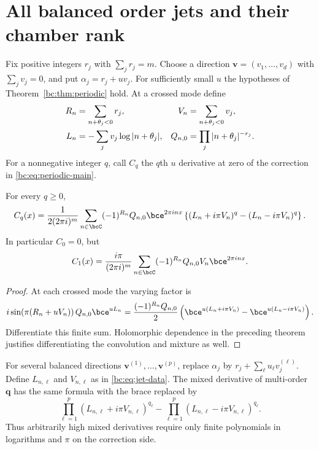 \section{All balanced order jets and their chamber rank}
\label{bc:sec:jets}

Fix positive integers $r_j$ with $\sum_jr_j=m$. Choose a direction
$\bm v=(v_1,\ldots,v_d)$ with $\sum_jv_j=0$, and put
$\alpha_j=r_j+uv_j$. For sufficiently small $u$ the hypotheses of
Theorem~\ref{bc:thm:periodic} hold. At a crossed mode define
\begin{align}
 R_n&=\sum_{n+\theta_j<0}r_j,&
 V_n&=\sum_{n+\theta_j<0}v_j,\notag\\
 L_n&=-\sum_jv_j\log|n+\theta_j|,&
 Q_{n,0}&=\prod_j|n+\theta_j|^{-r_j}.
 \label{bc:eq:jet-data}
\end{align}
For a nonnegative integer $q$, call $C_q$ the $q$th $u$ derivative at zero
of the correction in \eqref{bc:eq:periodic-main}.

\begin{theorem}
\label{bc:thm:jets}
For every $q\ge0$,
\begin{equation}\label{bc:eq:jet-main}
 C_q(x)=\frac1{2(2\pi i)^m}\sum_{n\in\bcC}
 (-1)^{R_n}Q_{n,0}\bce^{2\pi i n x}
 \left\{(L_n+i\pi V_n)^q-(L_n-i\pi V_n)^q\right\}.
\end{equation}
In particular $C_0=0$, but
\begin{equation}\label{bc:eq:first-jet}
 C_1(x)=\frac{i\pi}{(2\pi i)^m}\sum_{n\in\bcC}
             (-1)^{R_n}Q_{n,0}V_n\bce^{2\pi i n x}.
\end{equation}
\end{theorem}
\begin{proof}
At each crossed mode the varying factor is
\[
 i\sin(\pi(R_n+uV_n))\,Q_{n,0}\bce^{uL_n}
 =\frac{(-1)^{R_n}Q_{n,0}}2
     \left(\bce^{u(L_n+i\pi V_n)}
                  -\bce^{u(L_n-i\pi V_n)}\right).
\]
Differentiate this finite sum. Holomorphic dependence in the preceding
theorem justifies differentiating the convolution and mixture as well.
\end{proof}

For several balanced directions $\bm v^{(1)},\ldots,\bm v^{(p)}$, replace
$\alpha_j$ by $r_j+\sum_\ell u_\ell v_j^{(\ell)}$. Define $L_{n,\ell}$ and
$V_{n,\ell}$ as in \eqref{bc:eq:jet-data}. The mixed derivative of
multi-order $\bm q$ has the same formula with the brace replaced by
\begin{equation}\label{bc:eq:multi-jet}
 \prod_{\ell=1}^p(L_{n,\ell}+i\pi V_{n,\ell})^{q_\ell}
 -\prod_{\ell=1}^p(L_{n,\ell}-i\pi V_{n,\ell})^{q_\ell}.
\end{equation}
Thus arbitrarily high mixed derivatives require only finite
polynomials in logarithms and $\pi$ on the correction side.

